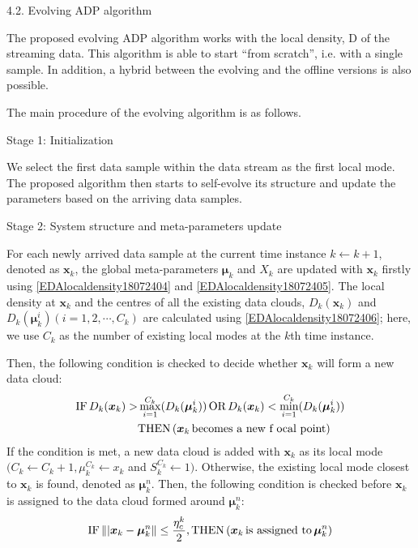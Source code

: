 {4.2. Evolving ADP algorithm

The proposed evolving ADP algorithm works with the local density, D of the streaming data. This algorithm is able to start “from scratch”, i.e. with a single sample. In addition, a hybrid between the evolving and the offline versions is also possible.

The main procedure of the evolving algorithm is as follows.

Stage 1: Initialization

We select the first data sample within the data stream as the first local mode. The proposed algorithm then starts to self-evolve its structure and update the parameters based on the arriving data samples.

Stage 2: System structure and meta-parameters update

For each newly arrived data sample at the current time instance $k \leftarrow k + 1$, denoted as $\bm x_k$, the global meta-parameters $\bm \mu_k$ and $X_k$ are updated with $\bm x_k$ firstly using \eqref{EDAlocaldensity18072404} and \eqref{EDAlocaldensity18072405}. The local density at $\bm x_k$ and the centres of all the existing data clouds, $D_k(\bm x_k)$ and $D_k(\bm \mu^i _k) (i = 1, 2, \cdots ,C_k)$ are calculated using \eqref{EDAlocaldensity18072406}; here, we use $C_k$ as the number of existing local modes at the $k$th
time instance.

Then, the following condition \cite{Angelov2012Autonomous} is checked to decide whether $\bm x_k$ will form a new data cloud:
\begin{align}\label{EDAlocaldensity18072417}
  \textup{IF}\, D_k(\bm x_k) > &\max_{i=1}^{C_k } (D_k(\bm \mu^i _k))\, \textup{OR}\, D_k(\bm x_k) < \min_{i=1}^ {C_k} (D_k(\bm \mu^i _k))\notag\\
    &\textup{THEN}\, (\bm x_k\,  \textup{becomes a new f ocal point})
\end{align}
If the condition is met, a new data cloud is added with $\bm x_k$ as its local mode $(C_k \leftarrow C_k + 1,\mu_k^{C_k} \leftarrow x_k$ and $S_k^{C_k} \leftarrow 1)$.
Otherwise, the existing local mode closest to $\bm x_k$ is found, denoted as $\bm \mu^n_k$. Then, the following condition is checked before $\bm x_k$ is assigned to the data cloud formed around $\bm \mu^n_k$:
\begin{align}\label{EDAlocaldensity18072418}
  \textup{IF}\, \||\bm x_k - \bm\mu^n_k\| \leq \frac{\eta^k_c} 2, \textup{THEN}\, (\bm x_k\, \textup{is assigned to}\, \bm\mu^n_k)
\end{align}

}
